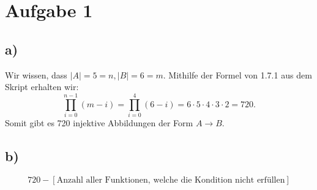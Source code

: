 \section*{Aufgabe 1}
\subsection*{a)}

Wir wissen, dass $ |A| = 5 = n, |B| = 6 = m $. Mithilfe der Formel von 1.7.1 aus dem Skript erhalten wir:
\[
  \prod_{i=0}^{n-1}(m-i) = \prod_{i=0}^{4}(6-i) = 6\cdot5\cdot4\cdot3\cdot2 = 720.
\]
Somit gibt es 720 injektive Abbildungen der Form $ A \rightarrow B $.
\subsection*{b)}
\[
  720 - [\text{Anzahl aller Funktionen, welche die Kondition nicht erfüllen}]
\]
